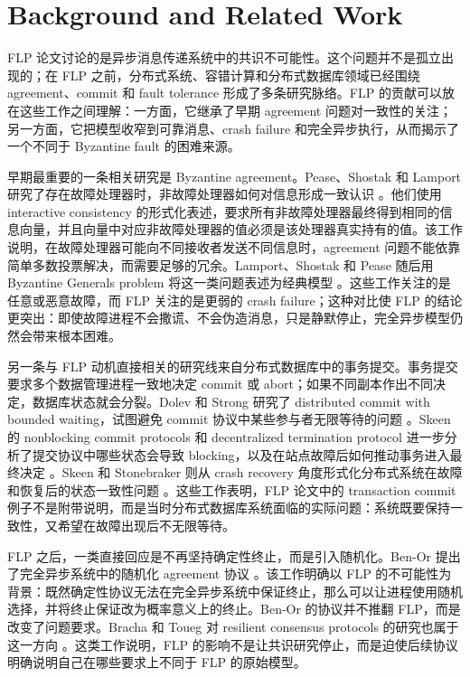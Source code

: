 \section{Background and Related Work}

FLP 论文讨论的是异步消息传递系统中的共识不可能性。这个问题并不是孤立出现的；在 FLP 之前，分布式系统、容错计算和分布式数据库领域已经围绕 agreement、commit 和 fault tolerance 形成了多条研究脉络。FLP 的贡献可以放在这些工作之间理解：一方面，它继承了早期 agreement 问题对一致性的关注；另一方面，它把模型收窄到可靠消息、crash failure 和完全异步执行，从而揭示了一个不同于 Byzantine fault 的困难来源。

早期最重要的一条相关研究是 Byzantine agreement。Pease、Shostak 和 Lamport 研究了存在故障处理器时，非故障处理器如何对信息形成一致认识 \cite{pease1980reaching}。他们使用 interactive consistency 的形式化表述，要求所有非故障处理器最终得到相同的信息向量，并且向量中对应非故障处理器的值必须是该处理器真实持有的值。该工作说明，在故障处理器可能向不同接收者发送不同信息时，agreement 问题不能依靠简单多数投票解决，而需要足够的冗余。Lamport、Shostak 和 Pease 随后用 Byzantine Generals problem 将这一类问题表述为经典模型 \cite{lamport1982byzantine}。这些工作关注的是任意或恶意故障，而 FLP 关注的是更弱的 crash failure；这种对比使 FLP 的结论更突出：即使故障进程不会撒谎、不会伪造消息，只是静默停止，完全异步模型仍然会带来根本困难。

另一条与 FLP 动机直接相关的研究线来自分布式数据库中的事务提交。事务提交要求多个数据管理进程一致地决定 commit 或 abort；如果不同副本作出不同决定，数据库状态就会分裂。Dolev 和 Strong 研究了 distributed commit with bounded waiting，试图避免 commit 协议中某些参与者无限等待的问题 \cite{dolev1982distributed}。Skeen 的 nonblocking commit protocols 和 decentralized termination protocol 进一步分析了提交协议中哪些状态会导致 blocking，以及在站点故障后如何推动事务进入最终决定 \cite{skeen1981nonblocking,skeen1982decentralized}。Skeen 和 Stonebraker 则从 crash recovery 角度形式化分布式系统在故障和恢复后的状态一致性问题 \cite{skeen1983formal}。这些工作表明，FLP 论文中的 transaction commit 例子不是附带说明，而是当时分布式数据库系统面临的实际问题：系统既要保持一致性，又希望在故障出现后不无限等待。

FLP 之后，一类直接回应是不再坚持确定性终止，而是引入随机化。Ben-Or 提出了完全异步系统中的随机化 agreement 协议 \cite{benor1983advantage}。该工作明确以 FLP 的不可能性为背景：既然确定性协议无法在完全异步系统中保证终止，那么可以让进程使用随机选择，并将终止保证改为概率意义上的终止。Ben-Or 的协议并不推翻 FLP，而是改变了问题要求。Bracha 和 Toueg 对 resilient consensus protocols 的研究也属于这一方向 \cite{bracha1983resilient}。这类工作说明，FLP 的影响不是让共识研究停止，而是迫使后续协议明确说明自己在哪些要求上不同于 FLP 的原始模型。

